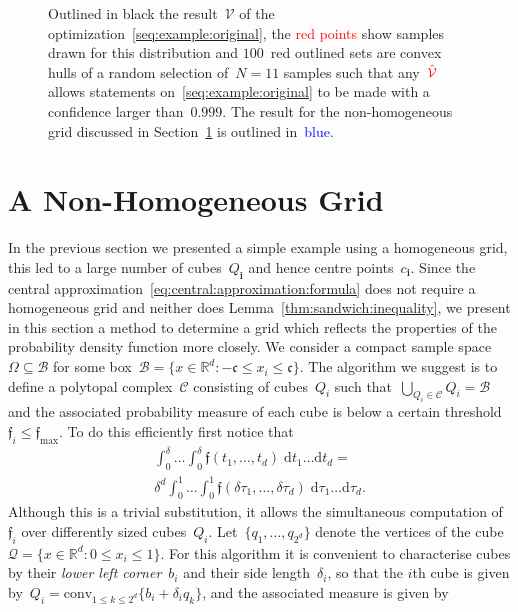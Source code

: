 \documentclass[letterpaper, 10pt, conference]{ieeeconf} %
\providecommand{\conv}{\text{conv}}
\providecommand{\bfa}[1]{\mathbf{#1}}
\begin{document}
\begin{figure}\centering

\captionsetup{font=small}
\caption{Outlined in black the result~$\mathcal V$ of the optimization~\eqref{seq:example:original}, the \textcolor{red}{red points} show samples drawn for this distribution and $100$~red outlined sets are convex hulls of a random selection of~$N=11$ samples such that any~$\textcolor{red}{\hat{\mathcal V}}$ allows statements on~\eqref{seq:example:original} to be made with a confidence larger than~$0.999$.
%
The result for the non-homogeneous grid discussed in Section~\ref{sec:improved:grid} is outlined in~\textcolor{blue}{blue}.}
\label{fig:example:in:comparison}
\end{figure}
%
%
%
\section{A Non-Homogeneous Grid}\label{sec:improved:grid}
%
%
%
\noindent In the previous section we presented a simple example using a homogeneous grid, this led to a large number of cubes~$Q_\bfa{i}$ and hence centre points~$c_\bfa{i}$.
%
Since the central approximation~\eqref{eq:central:approximation:formula} does not require a homogeneous grid and neither does Lemma~\ref{thm:sandwich:inequality}, we present in this section a method to determine a grid which reflects the properties of the probability density function more closely.
%
We consider a compact sample space~$\Omega\subseteq\mathcal B$ for some box~$\mathcal B=\{x\in\mathbb R^d:-\mathfrak{c}\leq x_i\leq \mathfrak{c}\}$.
%
The algorithm we suggest is to define a polytopal complex~$\mathcal C$ consisting of cubes~$Q_i$ such that~$\bigcup_{Q_i\in\mathcal C}Q_i=\mathcal B$ and the associated probability measure of each cube is below a certain threshold~$\mathfrak{f}_i\leq\mathfrak{f}_{\max}$.
%
To do this efficiently first notice that
\begin{multline*}
\int_0^{\delta}\dots\int_0^\delta \mathfrak{f}(t_1,\dots,t_d)\; \mathrm d t_1\dots \mathrm dt _d = \\ \delta^d\int_0^1\dots\int_0^1 \mathfrak {f}(\delta\tau_1,\dots,\delta\tau_d)
\; \mathrm d\tau_1\dots \mathrm d\tau_d .
\end{multline*}
Although this is a trivial substitution, it allows the simultaneous computation of~$\mathfrak{f}_i$ over differently sized cubes~$Q_i$.
%
Let~$\{q_1,\dots,q_{2^d}\}$ denote the vertices of the cube~$\mathcal Q=\{x\in\mathbb R^d: 0\leq x_i\leq 1\}$. For this algorithm it is convenient to characterise cubes by their \emph{lower left corner}~$b_i$ and their side length~$\delta_i$, so that the $i$th cube is given by~$Q_i=\conv_{1\leq k\leq2^d}\{b_i+\delta_i q_k\}$, and the associated measure is given by
\end{document}
